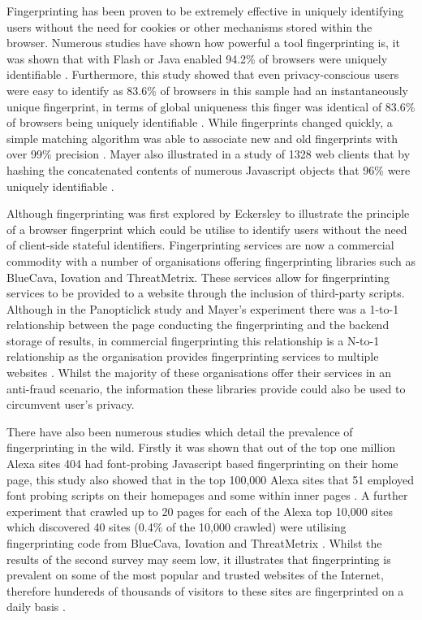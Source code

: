 \documentclass{article}
\begin{document}
Fingerprinting has been proven to be extremely effective in uniquely identifying users without the need for cookies or other mechanisms stored within the browser. Numerous studies have shown how powerful a tool fingerprinting is, it was shown that with Flash or Java enabled 94.2\% of browsers were uniquely identifiable \parencite{uniqueBrowser}. Furthermore, this study showed that even privacy-conscious users were easy to identify as 83.6\% of browsers in this sample had an instantaneously unique fingerprint, in terms of global uniqueness this finger was identical of 83.6\% of browsers being uniquely identifiable \parencite{uniqueBrowser}. While fingerprints changed quickly, a simple matching algorithm was able to associate new and old fingerprints with over 99\% precision \parencite{uniqueBrowser}. Mayer also illustrated in a study of 1328 web clients that by hashing the concatenated contents of numerous Javascript objects that 96\% were uniquely identifiable \parencite{mayer09}. 

Although fingerprinting was first explored by Eckersley \parencite{uniqueBrowser} to illustrate the principle of a browser fingerprint which could be utilise to identify users without the need of client-side stateful identifiers. Fingerprinting services are now a commercial commodity with a number of organisations offering fingerprinting libraries such as BlueCava, Iovation and ThreatMetrix. These services allow for fingerprinting services to be provided to a website through the inclusion of third-party scripts. Although in the Panopticlick study \parencite{uniqueBrowser} and Mayer's experiment \parencite{mayer09} there was a 1-to-1 relationship between the page conducting the fingerprinting and the backend storage of results, in commercial fingerprinting this relationship is a N-to-1 relationship as the organisation provides fingerprinting services to multiple websites \parencite{cookielessMonster}. Whilst the majority of these organisations offer their services in an anti-fraud scenario, the information these libraries provide could also be used to circumvent user's privacy. 

There have also been numerous studies which detail the prevalence of fingerprinting in the wild. Firstly it was shown that out of the top one million Alexa sites 404 had font-probing Javascript based fingerprinting on their home page, this study also showed that in the top 100,000 Alexa sites that 51 employed font probing scripts on their homepages and some within inner pages \parencite{dustingFP}. A further experiment that crawled up to 20 pages for each of the Alexa top 10,000 sites which discovered 40 sites (0.4\% of the 10,000 crawled) were utilising fingerprinting code from BlueCava, Iovation and ThreatMetrix \parencite{cookielessMonster}. Whilst the results of the second survey may seem low, it illustrates that fingerprinting is prevalent on some of the most popular and trusted websites of the Internet, therefore hundereds of thousands of visitors to these sites are fingerprinted on a daily basis \parencite{cookielessMonster}.   
\end{document}

